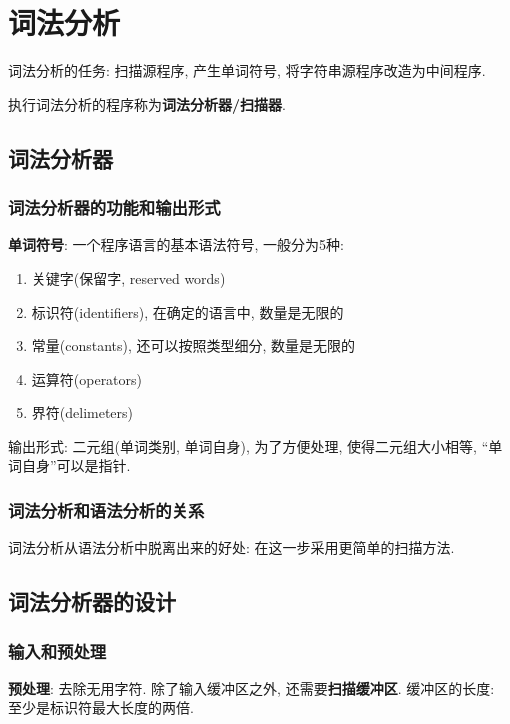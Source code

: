 \chapter{词法分析}

词法分析的任务: 扫描源程序, 产生单词符号, 将字符串源程序改造为中间程序.

执行词法分析的程序称为\textbf{词法分析器/扫描器}.

\section{词法分析器}

    \subsection{词法分析器的功能和输出形式}

        \textbf{单词符号}: 一个程序语言的基本语法符号, 一般分为5种:

        \begin{enumerate}
            \item 关键字(保留字, reserved words)
            \item 标识符(identifiers), 在确定的语言中, 数量是无限的
            \item 常量(constants), 还可以按照类型细分, 数量是无限的
            \item 运算符(operators)
            \item 界符(delimeters)
        \end{enumerate}

        输出形式: 二元组(单词类别, 单词自身), 为了方便处理, 使得二元组大小相等, ``单词自身''可以是指针.

    \subsection{词法分析和语法分析的关系}

        词法分析从语法分析中脱离出来的好处: 在这一步采用更简单的扫描方法.
    
\section{词法分析器的设计}

    \subsection{输入和预处理}

        \textbf{预处理}: 去除无用字符. 除了输入缓冲区之外, 还需要\textbf{扫描缓冲区}. 缓冲区的长度: 至少是标识符最大长度的两倍.

